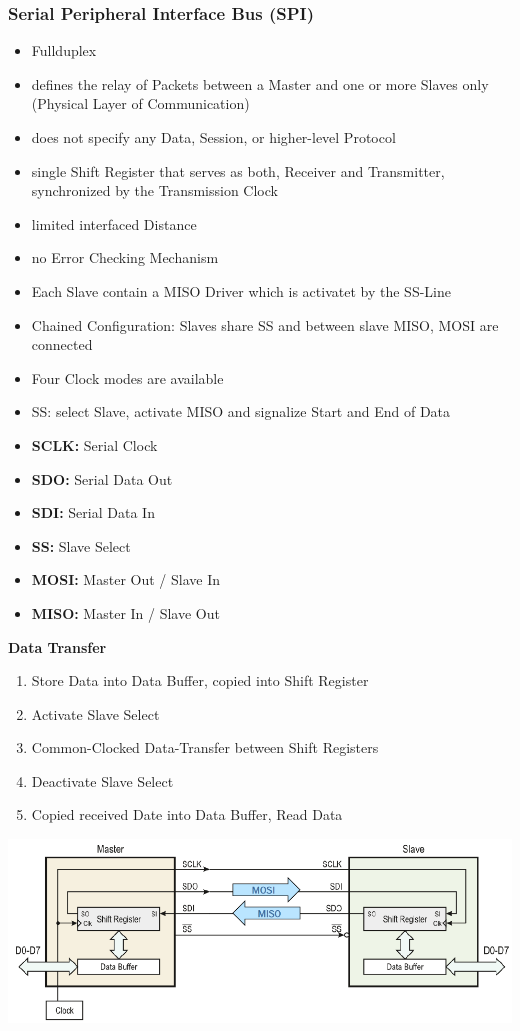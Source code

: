 \subsubsection{Serial Peripheral Interface Bus (SPI)} %
\begin{itemize}
	\item Fullduplex
	\item defines the relay of Packets between a Master and one or more Slaves only (Physical Layer of Communication)
	\item does not specify any Data, Session, or higher-level Protocol
	\item single Shift Register that serves as both, Receiver and Transmitter, synchronized by the Transmission Clock
	\item limited interfaced Distance
	\item no Error Checking Mechanism
	\item Each Slave contain a MISO Driver which is activatet by the SS-Line
	\item Chained Configuration: Slaves share SS and between slave MISO, MOSI are connected
	\item Four Clock modes are available
	\item SS: select Slave, activate MISO and signalize Start and End of Data
	\item \textbf{SCLK: }Serial Clock
	\item \textbf{SDO: } Serial Data Out
	\item \textbf{SDI: } Serial Data In
	\item \textbf{SS: }Slave Select
	\item \textbf{MOSI: }Master Out / Slave In
	\item \textbf{MISO: }Master In / Slave Out	
\end{itemize}
\textbf{Data Transfer}\\
\begin{enumerate}
	\item Store Data into Data Buffer, copied into Shift Register
	\item Activate Slave Select
	\item Common-Clocked Data-Transfer between Shift Registers
	\item Deactivate Slave Select
	\item Copied received Date into Data Buffer, Read Data
\end{enumerate}
\includegraphics[width=14cm]{images/spi.png}
\clearpage
\pagebreak
